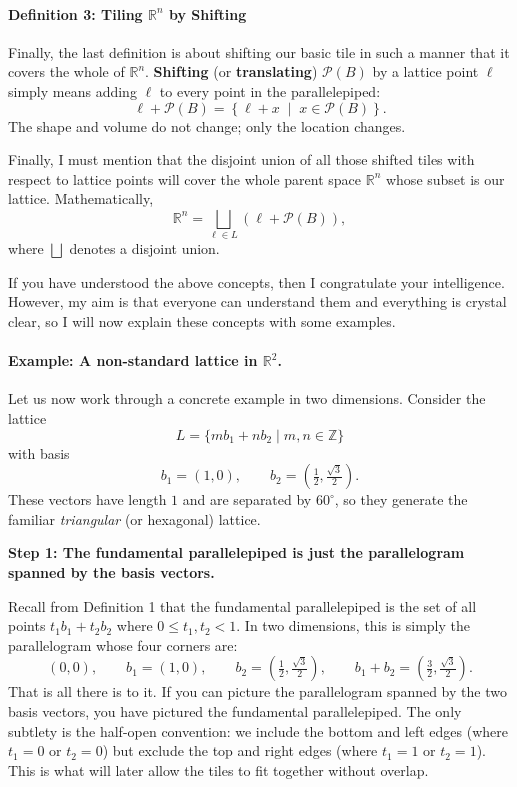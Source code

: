 \documentclass[11pt]{article}
\begin{document}
\paragraph{Definition 3: Tiling $\mathbb{R}^n$ by Shifting}

Finally, the last definition is about shifting our basic tile in such a manner that it covers the whole of $\mathbb{R}^n$.
\textbf{Shifting} (or \textbf{translating}) $\mathcal{P}(B)$ by a lattice point $\ell$ simply means adding $\ell$ to every point in
the parallelepiped:
\[
\ell+\mathcal{P}(B)
=
\left\{
\ell+x
\;\middle|\;
x\in\mathcal{P}(B)
\right\}.
\]
The shape and volume do not change; only the location changes.

Finally, I must mention that the disjoint union of all those shifted tiles with respect to lattice points will cover the whole parent space $\mathbb{R}^n$ whose subset is our lattice. Mathematically,
\[
\mathbb{R}^n
=
\bigsqcup_{\ell\in L}
\left(\ell+\mathcal{P}(B)\right),
\]
where $\bigsqcup$ denotes a disjoint union.

If you have understood the above concepts, then I congratulate your intelligence. However, my aim is that everyone can understand them and everything is crystal clear, so I will now explain these concepts with some examples.

\paragraph{Example: A non-standard lattice in $\mathbb{R}^2$.}

Let us now work through a concrete example in two dimensions. Consider the lattice
\[
L = \{ m b_1 + n b_2 \mid m,n \in \mathbb{Z} \}
\]
with basis
\[
b_1 = (1,0), \qquad b_2 = \left(\tfrac12, \tfrac{\sqrt{3}}{2}\right).
\]
These vectors have length $1$ and are separated by $60^\circ$, so they generate the familiar \emph{triangular} (or hexagonal) lattice.

\medskip
\noindent
\textbf{Step 1: The fundamental parallelepiped is just the parallelogram spanned by the basis vectors.}

Recall from Definition 1 that the fundamental parallelepiped is the set of all points $t_1 b_1 + t_2 b_2$ where $0 \le t_1, t_2 < 1$. In two dimensions, this is simply the parallelogram whose four corners are:
\[
(0,0), \qquad b_1 = (1,0), \qquad b_2 = \left(\tfrac12, \tfrac{\sqrt{3}}{2}\right), \qquad b_1 + b_2 = \left(\tfrac32, \tfrac{\sqrt{3}}{2}\right).
\]
That is all there is to it. If you can picture the parallelogram spanned by the two basis vectors, you have pictured the fundamental parallelepiped. The only subtlety is the half-open convention: we include the bottom and left edges (where $t_1 = 0$ or $t_2 = 0$) but exclude the top and right edges (where $t_1 = 1$ or $t_2 = 1$). This is what will later allow the tiles to fit together without overlap.
\end{document}
